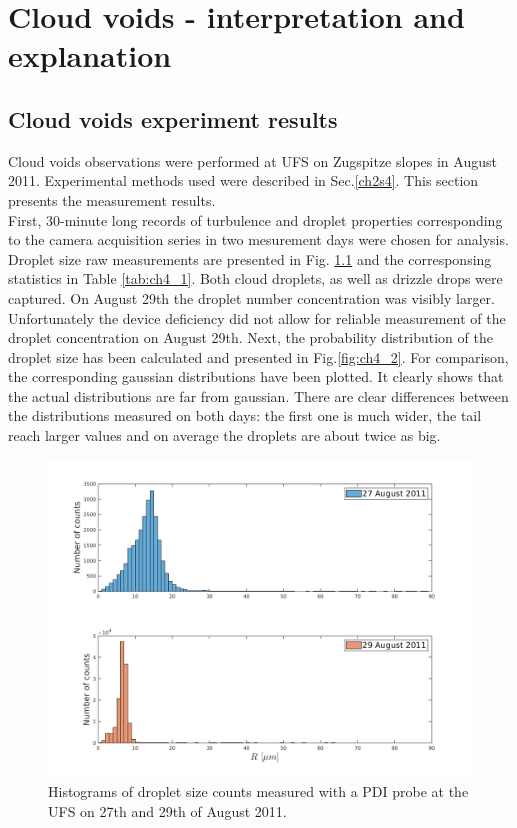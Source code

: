 \documentclass[../main.tex]{subfiles}
\begin{document}
\chapter{Cloud voids - interpretation and explanation} %

\label{ch:holes} %



\section{Cloud voids experiment results}
Cloud voids observations were performed at UFS on Zugspitze slopes in August 2011. Experimental methods used were described in Sec.\autoref{ch2s4}. This section presents the measurement results.\\
First, 30-minute long records of turbulence and droplet properties corresponding to the camera acquisition series in two mesurement days were chosen for analysis. Droplet size raw measurements are presented in Fig. \ref{fig:ch4_1} and the corresponsing statistics in Table \ref{tab:ch4_1}. Both cloud droplets, as well as drizzle drops were captured. On August 29th the droplet number concentration was visibly larger. Unfortunately the device deficiency did not allow for reliable measurement of the droplet concentration on August 29th. Next, the probability distribution of the droplet size has been calculated and presented in Fig.\ref{fig:ch4_2}. For comparison, the corresponding gaussian distributions have been plotted. It clearly shows that the actual distributions are far from gaussian. There are clear differences between the distributions measured on both days: the first one is much wider, the tail reach larger values and on average the droplets are about twice as big.

\begin{figure}[h]
\centering
\noindent\includegraphics[width=30pc]{gfx/Hist_counts_raw.png}
\caption{Histograms of droplet size counts measured with a PDI probe at the UFS on 27th and 29th of August 2011.}
\label{fig:ch4_1}
\end{figure}
\end{document}
